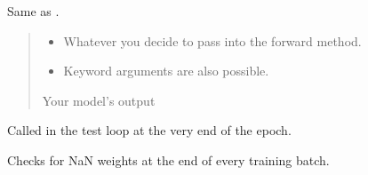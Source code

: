 \documentclass[letterpaper,10pt,english]{sphinxmanual}
\begin{document}
\begin{fulllineitems}
\begin{fulllineitems}
\end{fulllineitems}


\begin{fulllineitems}
\label{\detokenize{train:train.PcrCNN.forward}}
\pysigstartsignatures
\pysiglinewithargsret
{}
{}
{}
\pysigstopsignatures
\sphinxAtStartPar
Same as .
\begin{quote}\begin{description}
\begin{itemize}
\item {} 
\sphinxAtStartPar
{} \textendash{} Whatever you decide to pass into the forward method.

\item {} 
\sphinxAtStartPar
{} \textendash{} Keyword arguments are also possible.

\end{itemize}

\sphinxAtStartPar
Your model’s output

\end{description}\end{quote}

\end{fulllineitems}


\begin{fulllineitems}
\label{\detokenize{train:train.PcrCNN.on_test_epoch_end}}
\pysigstartsignatures
\pysiglinewithargsret
{}
{}
{}
\pysigstopsignatures
\sphinxAtStartPar
Called in the test loop at the very end of the epoch.

\end{fulllineitems}


\begin{fulllineitems}
\label{\detokenize{train:train.PcrCNN.on_train_batch_end}}
\pysigstartsignatures
\pysiglinewithargsret
{}
{\sphinxparamcomma {}\sphinxparamcomma {}}
{}
\pysigstopsignatures
\sphinxAtStartPar
Checks for NaN weights at the end of every training batch.


\end{fulllineitems}
\end{fulllineitems}
\end{document}
